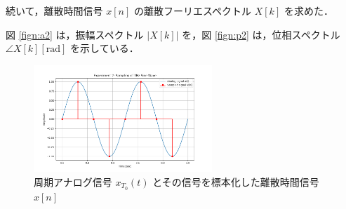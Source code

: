 \documentclass[fleqn, a4paper. 12pt]{jsarticle}
\begin{document}
  続いて，離散時間信号 $x[n]$ の離散フーリエスペクトル $X[k]$ を求めた．

  図 \ref{fign:a2} は，振幅スペクトル $|X[k]|$ を，図 \ref{fign:p2} は，位相スペクトル $\angle X[k][\mathrm{rad}]$ を示している．

  \begin{figure}[!h]
    \centering
    \includegraphics[width=0.6\textwidth]{sampling_experiment_2.png}
    \caption{周期アナログ信号 $x_{T_0}(t)$ とその信号を標本化した離散時間信号 $x[n]$}
    \label{fig:s2}
  \end{figure}
\end{document}
